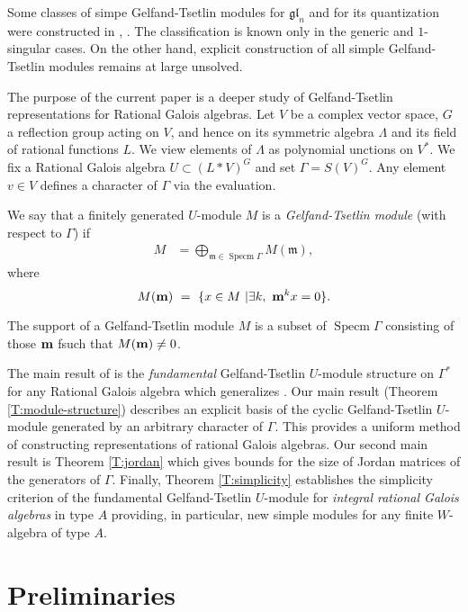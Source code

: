 \documentclass[11pt,fleqn]{amsart}
\newcommand\m{\mathfrak m}
\newcommand\gl{\mathfrak{gl}}
\DeclareMathOperator\Specm{Specm}
\begin{document}
Some classes of simpe Gelfand-Tsetlin modules for $\gl_n$ and for its 
quantization were constructed in \cite{FRZ1}, \cite{FRZ2}. The classification 
is known only in the generic \cite{FGR-generic-irreducible} and $1$-singular 
\cite{FGR-drinfeld} cases. 
On the other hand, explicit construction of all simple Gelfand-Tsetlin
modules remains at large unsolved.

The purpose of the current paper is a deeper study of Gelfand-Tsetlin 
representations for Rational Galois algebras. Let $V$ be a complex vector 
space, $G$ a reflection group acting on $V$, and hence on its symmetric 
algebra $\Lambda$ and its field of rational functions $L$. We view elements of 
$\Lambda$ as polynomial unctions on $V^*$. We fix a Rational Galois algebra 
$U \subset (L*V)^G$ and set $\Gamma=S(V)^G$. Any element $v\in V$ defines a 
character of $\Gamma$ via the evaluation. 

We say that a finitely generated $U$-module $M$ is a \emph{Gelfand-Tsetlin 
module} (with respect to $\Gamma$) if 
\begin{align*} 
 M &= \underset{\m \in \Specm \Gamma}{\bigoplus} M(\m),
\end{align*}
where
 \begin{equation*} M({\bf m}) \ = \ \{ x\in M\ | \exists k, \ {\bf m}^k x
=0\}.
\end{equation*}

The
{support}{} of a Gelfand-Tsetlin module $M$ is a subset of $\Specm {\Gamma}$ consisting of those ${\bf m}$ fsuch that
$M({\bf m})\ne 0$.


The main result of \cite{Hart-rational-galois} is the \emph{fundamental} Gelfand-Tsetlin $U$-module structure on $\Gamma^*$ for any Rational Galois algebra which generalizes \cite{EMV-orthogonal}. 
Our main result
(Theorem \ref{T:module-structure}) describes an explicit basis of the cyclic Gelfand-Tsetlin $U$-module generated by an arbitrary character of $\Gamma$. This provides a uniform method of constructing representations of rational Galois algebras. Our second main result is Theorem \ref{T:jordan} which gives bounds for the size of Jordan matrices of the generators of $\Gamma$. Finally, Theorem \ref{T:simplicity} establishes the simplicity criterion of the fundamental Gelfand-Tsetlin $U$-module for \emph{integral rational Galois algebras} in type $A$ providing, in particular, new simple modules for any finite $W$-algebra of type $A$.


\section{Preliminaries}
\end{document}
